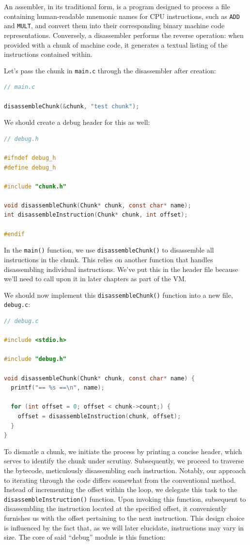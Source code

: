 An assembler, in its traditional form, is a program designed to process a file containing human-readable mnemonic names for CPU instructions, such as \verb.ADD. and \verb.MULT., and convert them into their corresponding binary machine code representations. Conversely, a disassembler performs the reverse operation: when provided with a chunk of machine code, it generates a textual listing of the instructions contained within.

Let's pass the chunk in \verb,main.c, through the disassembler after creation:

\begin{lstlisting}[language=C]
// main.c

disassembleChunk(&chunk, "test chunk");
\end{lstlisting}

We should create a debug header for this as well:

\begin{lstlisting}[language=C]
// debug.h

#ifndef debug_h
#define debug_h

#include "chunk.h"

void disassembleChunk(Chunk* chunk, const char* name);
int disassembleInstruction(Chunk* chunk, int offset);

#endif
\end{lstlisting}

In the \verb.main(). function, we use \verb.disassembleChunk(). to disassemble all instructions in the chunk. This relies on another function that handles disassembling individual instructions. We've put this in the header file because we'll need to call upon it in later chapters as part of the \ac{VM}.

We should now implement this \verb.disassembleChunk(). function into a new file, \verb,debug.c,:

\begin{lstlisting}[language=C]
// debug.c

#include <stdio.h>

#include "debug.h"

void disassembleChunk(Chunk* chunk, const char* name) {
  printf("== %s ==\n", name);

  for (int offset = 0; offset < chunk->count;) {
    offset = disassembleInstruction(chunk, offset);
  }
}
\end{lstlisting}

To dismatle a chunk, we initiate the process by printing a concise header, which serves to identify the chunk under scrutiny. Subsequently, we proceed to traverse the bytecode, meticulously disassembling each instruction. Notably, our approach to iterating through the code differs somewhat from the conventional method. Instead of incrementing the offset within the loop, we delegate this task to the \verb.disassembleInstruction(). function. Upon invoking this function, subsequent to disassembling the instruction located at the specified offset, it conveniently furnishes us with the offset pertaining to the next instruction. This design choice is influenced by the fact that, as we will later elucidate, instructions may vary in size. The core of said ``debug'' module is this function: 


